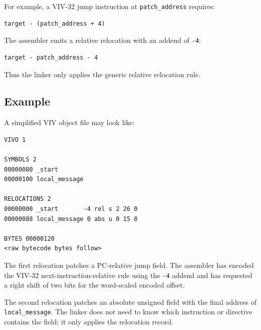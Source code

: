 For example, a VIV-32 jump instruction at \texttt{patch\_address} requires:

\begin{verbatim}
target - (patch_address + 4)
\end{verbatim}

The assembler emits a relative relocation with an addend of \texttt{-4}:

\begin{verbatim}
target - patch_address - 4
\end{verbatim}

Thus the linker only applies the generic relative relocation rule.

\subsection{Example}

A simplified VIV object file may look like:

\begin{verbatim}
VIVO 1

SYMBOLS 2
00000080 _start
00000100 local_message

RELOCATIONS 2
00000000 _start       -4 rel s 2 26 0
00000088 local_message 0 abs u 0 15 8

BYTES 00000120
<raw bytecode bytes follow>
\end{verbatim}

The first relocation patches a PC-relative jump field. The assembler has encoded the
VIV-32 next-instruction-relative rule using the \texttt{-4} addend and has requested a
right shift of two bits for the word-scaled encoded offset.

The second relocation patches an absolute unsigned field with the final address of
\texttt{local\_message}. The linker does not need to know which instruction or
directive contains the field; it only applies the relocation record.
